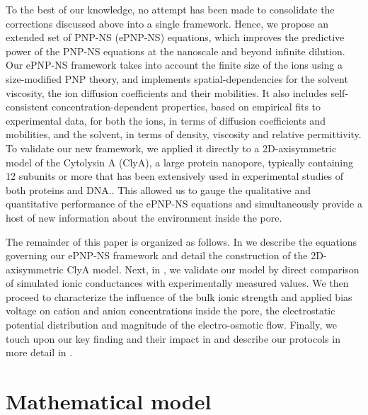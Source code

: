 \documentclass[journal=ancac3,manuscript=article,etalmode=truncate,maxauthors=0,layout=twocolumn]{achemso}
\begin{document}
To the best of our knowledge, no attempt has been made to consolidate the corrections discussed above into a
single framework. Hence, we propose an extended set of PNP-NS (ePNP-NS) equations, which improves the
predictive power of the PNP-NS equations at the nanoscale and beyond infinite dilution. Our ePNP-NS framework
takes into account the finite size of the ions using a size-modified PNP theory,\cite{Lu-2011} and implements
spatial-dependencies for the solvent viscosity,\cite{Pronk-2014,Hsu-2017} the ion diffusion coefficients and
their mobilities.\cite{Makarov-1998,Noskov-2004} It also includes self-consistent concentration-dependent
properties, based on empirical fits to experimental data, for both the ions, in terms of diffusion
coefficients and mobilities,\cite{Baldessari-2008-1,Mills-1989} and the solvent, in terms of density,
viscosity\cite{Hai-Lang-1996} and relative permittivity\cite{Gavish-2016}. To validate our new framework, we
applied it directly to a 2D-axisymmetric model of the Cytolysin A (ClyA), a large protein nanopore, typically
containing 12 subunits\cite{Mueller-2009} or more\cite{Soskine-2013} that has been extensively used in
experimental studies of both proteins\cite{Soskine-2013,VanMeervelt-2014,Soskine-Biesemans-2015,
Biesemans-Soskine-2015,Wloka-2017,VanMeervelt-2017,Galenkamp-2018} and DNA.\cite{Franceschini-2013,
Franceschini-2016}. This allowed us to gauge the qualitative and quantitative performance of the
ePNP-NS equations and simultaneously provide a host of new information about the environment inside the pore.

The remainder of this paper is organized as follows. In \emph{} we describe the
equations governing our ePNP-NS framework and detail the construction of the 2D-axisymmetric ClyA model. Next,
in \emph{}, we validate our model by direct comparison of simulated ionic conductances
with experimentally measured values. We then proceed to characterize the influence of the bulk ionic strength
and applied bias voltage on cation and anion concentrations inside the pore, the electrostatic potential
distribution and magnitude of the electro-osmotic flow. Finally, we touch upon our key finding and their
impact in \emph{} and describe our protocols in more detail in
\emph{}.




\section{Mathematical model}\label{sec:model}
\end{document}
